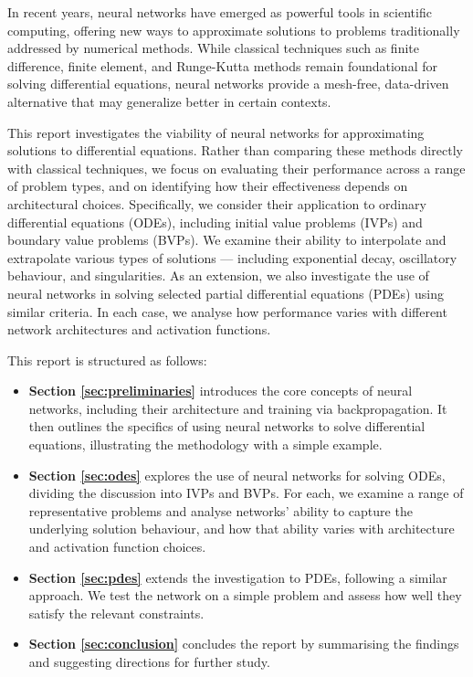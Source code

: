 In recent years, neural networks have emerged as powerful tools in scientific computing, 
offering new ways to approximate solutions to problems traditionally addressed by numerical methods. 
While classical techniques such as finite difference, finite element, and Runge-Kutta methods remain 
foundational for solving differential equations, neural networks provide a mesh-free, 
data-driven alternative that may generalize better in certain contexts.

This report investigates the viability of neural networks for approximating solutions to 
differential equations. Rather than comparing these methods directly with classical techniques, 
we focus on evaluating their performance across a range of problem types, and on identifying 
how their effectiveness depends on architectural choices. Specifically, we consider 
their application to ordinary differential equations (ODEs), 
including initial value problems (IVPs) and boundary value problems (BVPs). We 
examine their ability to interpolate and extrapolate various types of solutions — 
including exponential decay, oscillatory behaviour, and singularities. 
As an extension, we also investigate the use of neural networks in solving selected partial 
differential equations (PDEs) using similar criteria. In each case, we analyse how performance varies 
with different network architectures and activation functions.

This report is structured as follows:

\begin{itemize}
    \item \textbf{Section \ref{sec:preliminaries}} introduces the core concepts of neural networks, 
    including their architecture and training via backpropagation. It then outlines 
    the specifics of using neural networks to solve differential equations, illustrating the 
    methodology with a simple example.
    
    \item \textbf{Section \ref{sec:odes}} explores the use of neural networks for solving ODEs, 
    dividing the discussion into IVPs and BVPs. For each, we examine a range of representative problems 
    and analyse networks' ability to capture the underlying solution behaviour, and how that 
    ability varies with architecture and activation function choices.
    
    \item \textbf{Section \ref{sec:pdes}} extends the investigation to PDEs, following a similar approach. 
    We test the network on a simple problem and assess how well they satisfy the relevant constraints.
    
    \item \textbf{Section \ref{sec:conclusion}} concludes the report by summarising the findings and 
    suggesting directions for further study.
\end{itemize}
